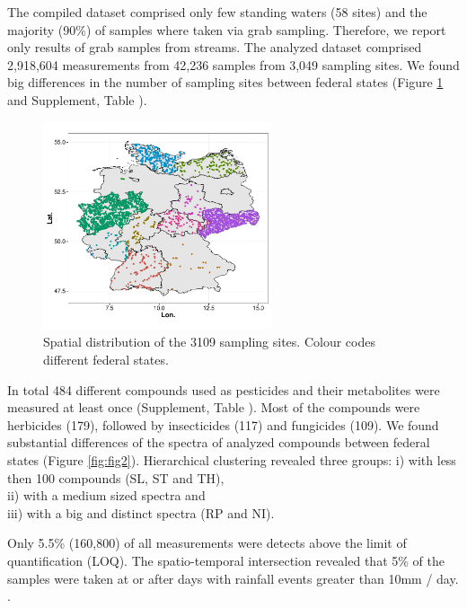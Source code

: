 \documentclass[journal=esthag,manuscript=article]{achemso}
\begin{document}
The compiled dataset comprised only few standing waters (58 sites) and the majority (90\%) of samples where taken via grab sampling.  %
Therefore, we report only results of grab samples from streams. 
The analyzed dataset comprised 2,918,604 measurements from 42,236 samples from 3,049 sampling sites.  %
We found big differences in the number of sampling sites between federal states (Figure \ref{fig:fig1} and Supplement, Table ).

\begin{figure}[ht]
  \includegraphics[width=0.6\textwidth]{figure1.pdf}
  \caption{Spatial distribution of the 3109 sampling sites. Colour codes different federal states.}
  \label{fig:fig1}
\end{figure}

In total 484 different compounds used as pesticides and their metabolites were measured at least once (Supplement, Table ). 
Most of the compounds were herbicides (179), followed by insecticides (117) and fungicides (109).
We found substantial differences of the spectra of analyzed compounds between federal states (Figure \ref{fig:fig2}).
Hierarchical clustering revealed three groups:
i) with less then 100 compounds (SL, ST and TH), \\
ii) with a medium sized spectra and \\
iii) with a big and distinct spectra (RP and NI).

Only 5.5\% (160,800) of all measurements were detects above the limit of quantification (LOQ).
The spatio-temporal intersection revealed that 5\% of the samples were taken at or after days with rainfall events greater than 10mm / day. .
\end{document}
